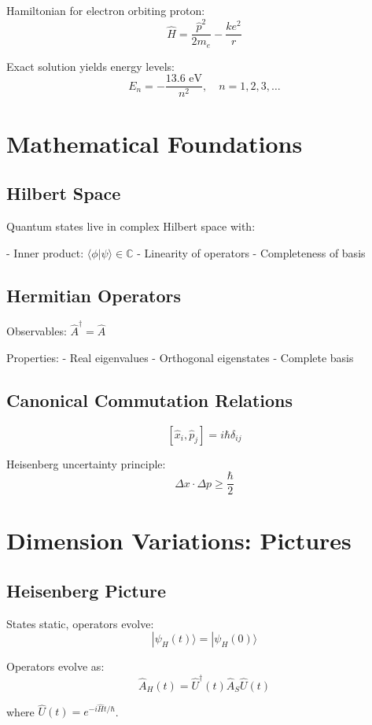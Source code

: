 \documentclass[12pt]{article}
\begin{document}
Hamiltonian for electron orbiting proton:
\[
\hat{H} = \frac{\hat{p}^2}{2m_e} - \frac{ke^2}{r}
\]

Exact solution yields energy levels:
\[
E_n = -\frac{13.6 \text{ eV}}{n^2}, \quad n = 1,2,3,\ldots
\]

\section{Mathematical Foundations}

\subsection{Hilbert Space}

Quantum states live in complex Hilbert space with:

- Inner product: $\langle\phi|\psi\rangle \in \mathbb{C}$
- Linearity of operators
- Completeness of basis

\subsection{Hermitian Operators}

Observables: $\hat{A}^\dagger = \hat{A}$

Properties:
- Real eigenvalues
- Orthogonal eigenstates
- Complete basis

\subsection{Canonical Commutation Relations}

\[
[\hat{x}_i, \hat{p}_j] = i\hbar\delta_{ij}
\]

Heisenberg uncertainty principle:
\[
\Delta x \cdot \Delta p \geq \frac{\hbar}{2}
\]

\section{Dimension Variations: Pictures}

\subsection{Heisenberg Picture}

States static, operators evolve:
\[
|\psi_H(t)\rangle = |\psi_H(0)\rangle
\]

Operators evolve as:
\[
\hat{A}_H(t) = \hat{U}^\dagger(t)\hat{A}_S\hat{U}(t)
\]

where $\hat{U}(t) = e^{-i\hat{H}t/\hbar}$.
\end{document}
